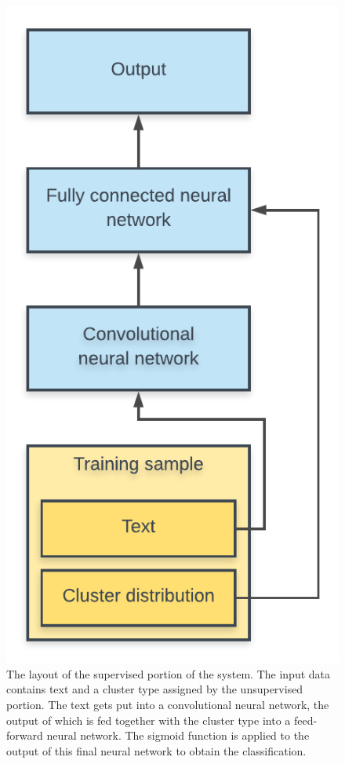 \begin{figure}[tbp]
  \centering
  \begin{minipage}[c]{0.5\textwidth}
    \includegraphics[width=\textwidth]{figures/nn_layout.pdf}
  \end{minipage}
  \hfill
  \begin{minipage}[c]{0.49\textwidth}
    \caption{The layout of the supervised portion of the system. The input data
    contains text and a cluster type assigned by the unsupervised portion. The
    text gets put into a convolutional neural network, the output of which is
    fed together with the cluster type into a feed-forward neural network.
    The sigmoid function is applied to the output of this final neural network
    to obtain the classification.\label{fig:nn_layout}}
  \end{minipage}
\end{figure}

